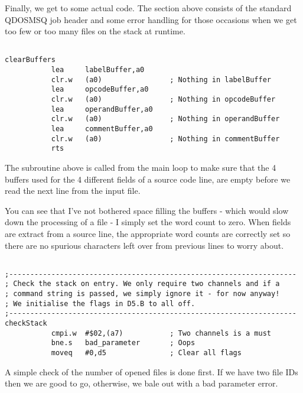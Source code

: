Finally, we get to some actual code. The section above consists of the standard QDOSMSQ job header and some error handling for those occasions when we get too few or too many files on the stack at runtime.

\begin{lstlisting}[firstnumber=last,caption={ASMReformat Source - Clear Buffers }]

clearBuffers
           lea     labelBuffer,a0
           clr.w   (a0)                ; Nothing in labelBuffer
           lea     opcodeBuffer,a0
           clr.w   (a0)                ; Nothing in opcodeBuffer
           lea     operandBuffer,a0
           clr.w   (a0)                ; Nothing in operandBuffer
           lea     commentBuffer,a0
           clr.w   (a0)                ; Nothing in commentBuffer
           rts
\end{lstlisting}

The subroutine above is called from the main loop to make sure that the 4 buffers used for the 4 different fields of a source code line, are empty before we read the next line from the input file. 

You can see that I've not bothered space filling the buffers - which would slow down the processing of a file - I simply set the word count to zero. When fields are extract from a source line, the appropriate word counts are correctly set so there are no spurious characters left over from previous lines to worry about.

\begin{lstlisting}[firstnumber=last,caption={ASMReformat Source - Check Stack}]

;--------------------------------------------------------------------
; Check the stack on entry. We only require two channels and if a 
; command string is passed, we simply ignore it - for now anyway!
; We initialise the flags in D5.B to all off.
;--------------------------------------------------------------------
checkStack
           cmpi.w  #$02,(a7)           ; Two channels is a must
           bne.s   bad_parameter       ; Oops
           moveq   #0,d5               ; Clear all flags 
\end{lstlisting}

A simple check of the number of opened files is done first. If we have two file IDs then we are good to go, otherwise, we bale out with a bad parameter error.

